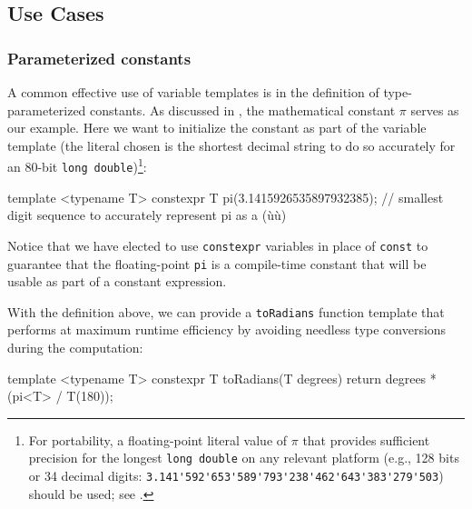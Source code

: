\subsection[Use Cases]{Use Cases}\label{variabletemplate-use-cases}

\subsubsection[Parameterized constants]{Parameterized constants}\label{parametrized-constants}

A common effective use of variable templates is in the definition of
type-parameterized constants. As discussed in ,
the mathematical
constant $\pi$ serves as our example. Here we want to
initialize the constant as part of the variable template (the literal
chosen is the shortest decimal string to do so accurately for an 80-bit
\lstinline!long!~\lstinline!double!){\cprotect\footnote{For
portability, a floating-point literal value of \(\pi\) that provides
sufficient precision for the longest \lstinline!long!~\lstinline!double! on
any relevant platform (e.g., 128 bits or 34 decimal digits:
\lstinline!3.141'592'653'589'793'238'462'643'383'279'503!) should be
  used; see .}}:

\begin{emcppslisting}[emcppsbatch=e4]
template <typename T>
constexpr T pi(3.1415926535897932385);
    // smallest digit sequence to accurately represent pi as a (ù{}ù)
\end{emcppslisting}
    
\noindent Notice that we have elected to use \lstinline!constexpr! variables in place of  \lstinline!const! to guarantee that the floating-point \lstinline!pi! is a compile-time constant that will be usable as part of a constant expression.

With the definition above, we can provide a
\lstinline!toRadians! function template that performs at maximum runtime
efficiency by avoiding needless type conversions during the computation:

\begin{emcppslisting}[emcppsbatch=e4]
template <typename T>
constexpr T toRadians(T degrees)
{
    return degrees * (pi<T> / T(180));
}
\end{emcppslisting}
    

